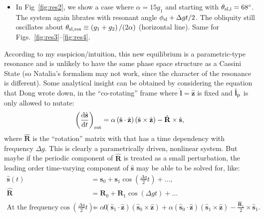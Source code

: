 \documentclass[11pt,
        usenames, %
        dvipsnames %
    ]{article}
\newcommand*{\rd}[2]{\frac{\mathrm{d}#1}{\mathrm{d}#2}}
\newcommand*{\bm}[1]{\boldsymbol{\mathbf{#1}}}
\newcommand*{\uv}[1]{\hat{\bm{#1}}}
\newcommand*{\p}[1]{\left(#1\right)}
\begin{document}
\begin{itemize}
    \item In Fig~\ref{fig:res2}, we show a case where $\alpha = 15g_1$ and
        starting with $\theta_{\rm sl, i} = 68^\circ$. The system again librates
        with resonant angle $\phi_{\rm sl} + \Delta g t / 2$. The obliquity
        still oscillates about $\theta_{\rm sl, res} \equiv \p{g_1 + g_2} /
        (2\alpha)$ (horizontal line). Same for
        Figs.~\ref{fig:res3}--\ref{fig:res4}.
\end{itemize}

According to my suspicion/intuition, this new equilibrium is a parametric-type
resonance and is unlikely to have the same phase space structure as a Cassini
State (so Natalia's formalism may not work, since the character of the resonance
is different). Some analytical insight can be obtained by considering the
equation that Dong wrote down, in the ``co-rotating'' frame where $\uv{l} =
\uv{z}$ is fixed and $\uv{l}_{\rm p}$ is only allowed to nutate:
\begin{equation}
    \p{\rd{\uv{s}}{t}}_{\rm rot} =
        \alpha \p{\uv{s} \cdot \uv{z}}\p{\uv{s} \times \uv{z}}
            - \uv{R} \times \uv{s},
\end{equation}
where $\uv{R}$ is the ``rotation'' matrix with that has a time dependency with
frequency $\Delta g$. This is clearly a parametrically driven, nonlinear system.
But maybe if the periodic component of $\uv{R}$ is treated as a small
perturbation, the leading order time-varying component of $\uv{s}$ may be able
to be solved for, like:
\begin{align}
    \uv{s}(t) &= \bm{s}_0 + \bm{s}_1\cos\p{\frac{\Delta g}{2}t} + \dots,\\
    \uv{R} &= \bm{R}_0 + \bm{R}_1\cos \p{\Delta gt} + \dots\\
    \text{At the frequency} \cos\p{ \frac{\Delta g}{2}t}:\quad 0 &=
        \alpha \p{\uv{s}_1 \cdot \uv{z}}\p{\uv{s}_0 \times \uv{z}}
        + \alpha \p{\uv{s}_0 \cdot \uv{z}}\p{\uv{s}_1 \times \uv{z}}
            - \frac{\uv{R}_1}{2} \times \uv{s}_1.
\end{align}
\end{document}
